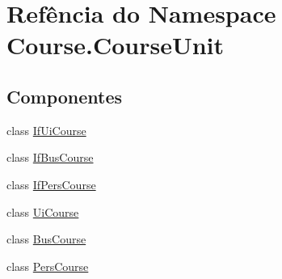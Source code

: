 \hypertarget{namespaceCourse_1_1CourseUnit}{\section{Refência do Namespace Course.\-Course\-Unit}
\label{namespaceCourse_1_1CourseUnit}
}
\subsection*{Componentes}
\begin{DoxyCompactItemize}
\item 
class \hyperlink{classCourse_1_1CourseUnit_1_1IfUiCourse}{If\-Ui\-Course}
\item 
class \hyperlink{classCourse_1_1CourseUnit_1_1IfBusCourse}{If\-Bus\-Course}
\item 
class \hyperlink{classCourse_1_1CourseUnit_1_1IfPersCourse}{If\-Pers\-Course}
\item 
class \hyperlink{classCourse_1_1CourseUnit_1_1UiCourse}{Ui\-Course}
\item 
class \hyperlink{classCourse_1_1CourseUnit_1_1BusCourse}{Bus\-Course}
\item 
class \hyperlink{classCourse_1_1CourseUnit_1_1PersCourse}{Pers\-Course}
\end{DoxyCompactItemize}
